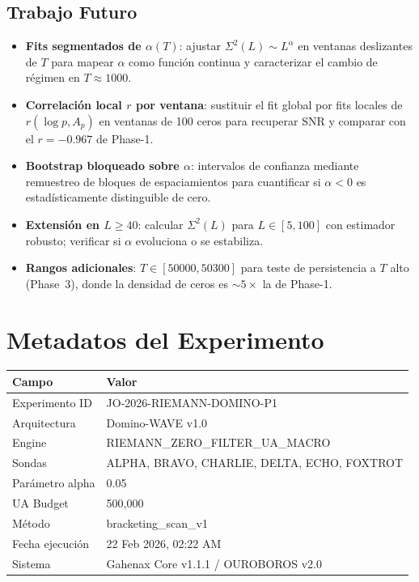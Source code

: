 \documentclass[12pt, a4paper]{article}
\begin{document}
\subsection{Trabajo Futuro}

\begin{itemize}
  \item \textbf{Fits segmentados de $\alpha(T)$}: ajustar $\Sigma^2(L)\sim L^\alpha$
        en ventanas deslizantes de $T$ para mapear $\alpha$ como función continua
        y caracterizar el cambio de régimen en $T\approx 1000$.
  \item \textbf{Correlación local $r$ por ventana}: sustituir el fit global
        por fits locales de $r(\log p, A_p)$ en ventanas de 100 ceros para
        recuperar SNR y comparar con el $r=-0.967$ de Phase-1.
  \item \textbf{Bootstrap bloqueado sobre $\alpha$}: intervalos de confianza
        mediante remuestreo de bloques de espaciamientos para cuantificar
        si $\alpha < 0$ es estadísticamente distinguible de cero.
  \item \textbf{Extensión en $L\geq 40$}: calcular $\Sigma^2(L)$ para
        $L\in[5,100]$ con estimador robusto; verificar si $\alpha$
        evoluciona o se estabiliza.
  \item \textbf{Rangos adicionales}: $T\in[50000,50300]$ para teste de
        persistencia a $T$ alto (Phase~3), donde la densidad de ceros es
        $\sim 5\times$ la de Phase-1.
\end{itemize}

\section*{Metadatos del Experimento}

\begin{table}[H]
\centering
\begin{tabular}{ll}
\toprule
\textbf{Campo} & \textbf{Valor} \\
\midrule
Experimento ID   & JO-2026-RIEMANN-DOMINO-P1 \\
Arquitectura     & Domino-WAVE v1.0 \\
Engine           & RIEMANN\_ZERO\_FILTER\_UA\_MACRO \\
Sondas           & ALPHA, BRAVO, CHARLIE, DELTA, ECHO, FOXTROT \\
Parámetro alpha  & 0.05 \\
UA Budget        & 500,000 \\
Método           & bracketing\_scan\_v1 \\
Fecha ejecución  & 22 Feb 2026, 02:22 AM \\
Sistema          & Gahenax Core v1.1.1 / OUROBOROS v2.0 \\
\bottomrule
\end{tabular}
\end{table}
\end{document}
